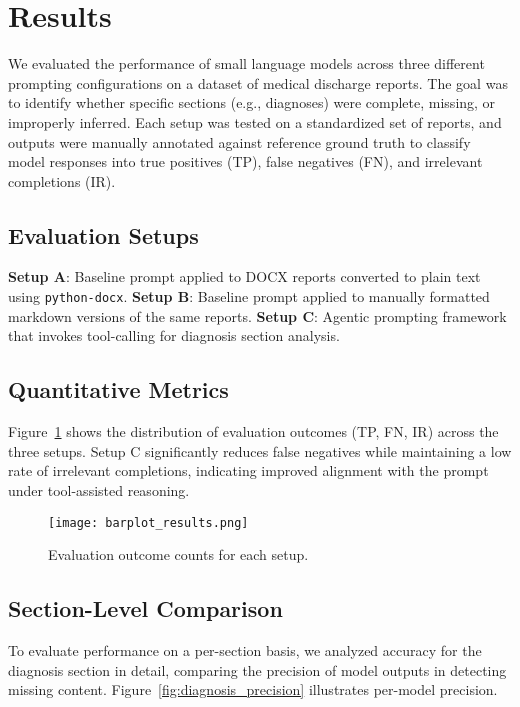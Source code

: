 \section{Results}

We evaluated the performance of small language models across three different prompting configurations on a dataset of medical discharge reports. The goal was to identify whether specific sections (e.g., diagnoses) were complete, missing, or improperly inferred. Each setup was tested on a standardized set of reports, and outputs were manually annotated against reference ground truth to classify model responses into true positives (TP), false negatives (FN), and irrelevant completions (IR).

\subsection{Evaluation Setups}

\textbf{Setup A}: Baseline prompt applied to DOCX reports converted to plain text using \texttt{python-docx}.  
\textbf{Setup B}: Baseline prompt applied to manually formatted markdown versions of the same reports.  
\textbf{Setup C}: Agentic prompting framework that invokes tool-calling for diagnosis section analysis.

\subsection{Quantitative Metrics}

Figure~\ref{fig:barplot} shows the distribution of evaluation outcomes (TP, FN, IR) across the three setups. Setup C significantly reduces false negatives while maintaining a low rate of irrelevant completions, indicating improved alignment with the prompt under tool-assisted reasoning.

\begin{figure}[H]
  \centering
  \texttt{[image: barplot\_results.png]}
  \caption{Evaluation outcome counts for each setup.}
  \label{fig:barplot}
\end{figure}

\subsection{Section-Level Comparison}

To evaluate performance on a per-section basis, we analyzed accuracy for the diagnosis section in detail, comparing the precision of model outputs in detecting missing content. Figure~\ref{fig:diagnosis_precision} illustrates per-model precision.

